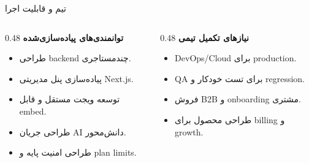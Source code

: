 \documentclass[aspectratio=169,12pt]{beamer}
\newcommand{\tagbox}[1]{\colorbox{soft}{\strut\hspace{1.2mm}{\small #1}\hspace{1.2mm}}}
\begin{document}
\begin{frame}{تیم و قابلیت اجرا}
  \begin{columns}[T,totalwidth=\textwidth]
    \begin{column}{0.48\textwidth}
      \textbf{توانمندی‌های پیاده‌سازی‌شده}
      \begin{itemize}
        \item طراحی backend چندمستاجری.
        \item پیاده‌سازی پنل مدیریتی Next.js.
        \item توسعه ویجت مستقل و قابل embed.
        \item طراحی جریان AI دانش‌محور.
        \item طراحی امنیت پایه و plan limits.
      \end{itemize}
    \end{column}
    \begin{column}{0.48\textwidth}
      \textbf{نیازهای تکمیل تیمی}
      \begin{itemize}
        \item DevOps/Cloud برای production.
        \item QA برای تست خودکار و regression.
        \item فروش B2B و onboarding مشتری.
        \item طراحی محصول برای billing و growth.
      \end{itemize}
    \end{column}
  \end{columns}

  \vspace{5mm}
  \begin{center}
    \tagbox{Engineering Prototype Ready}\hspace{2mm}
    \tagbox{Demo Ready}\hspace{2mm}
    \tagbox{Commercialization Next}
  \end{center}
\end{frame}
\end{document}
